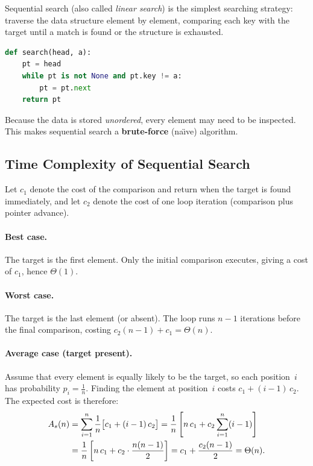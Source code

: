 \documentclass[11pt, a4paper, notitlepage]{report}
\theoremstyle{definition}
\theoremstyle{remark}
\theoremstyle{definition}
\begin{document}
Sequential search (also called \emph{linear search}) is the simplest searching
strategy: traverse the data structure element by element, comparing each key
with the target until a match is found or the structure is exhausted.

\begin{lstlisting}[language=Python]
def search(head, a):
    pt = head
    while pt is not None and pt.key != a:
        pt = pt.next
    return pt
\end{lstlisting}

Because the data is stored \emph{unordered}, every element may need to be
inspected.  This makes sequential search a \textbf{brute-force} (na\"{\i}ve)
algorithm.

\subsection{Time Complexity of Sequential Search}
\label{subsec:seq-time}

Let $c_1$ denote the cost of the comparison and return when the target is found
immediately, and let $c_2$ denote the cost of one loop iteration (comparison
plus pointer advance).

\paragraph{Best case.}
The target is the first element.  Only the initial comparison executes, giving
a cost of $c_1$, hence $\Theta(1)$.

\paragraph{Worst case.}
The target is the last element (or absent).  The loop runs $n-1$ iterations
before the final comparison, costing $c_2(n-1) + c_1 = \Theta(n)$.

\paragraph{Average case (target present).}
Assume that every element is equally likely to be the target, so each
position~$i$ has probability $p_i = \tfrac{1}{n}$.  Finding the element at
position~$i$ costs $c_1 + (i-1)\,c_2$.  The expected cost is therefore:
\begin{align}
  A_s(n) &= \sum_{i=1}^{n} \frac{1}{n}\bigl[c_1 + (i-1)\,c_2\bigr]
          = \frac{1}{n}\left[n\,c_1 + c_2\sum_{i=1}^{n}(i-1)\right] \notag \\
         &= \frac{1}{n}\left[n\,c_1 + c_2 \cdot \frac{n(n-1)}{2}\right]
          = c_1 + \frac{c_2(n-1)}{2} = \Theta(n). \label{eq:seq-avg}
\end{align}
\end{document}
